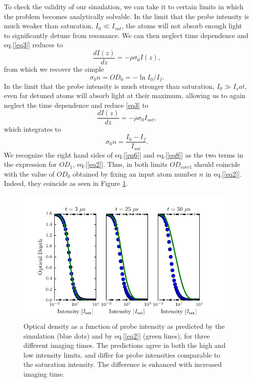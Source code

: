 \documentclass[12pt]{iopart}
\begin{document}
\par To check the validity of our simulation, we can take it to certain limits in which the problem becomes analytically solvable. In the limit that the probe intensity is much weaker than saturation, $I_0\ll I_{sat}$, the atoms will not absorb enough light to significantly detune from resonance. We can then neglect time dependence and eq.[\ref{eq3}] reduces to 
\begin{equation}
\frac{dI(z)}{dz}=-\rho\sigma_0 I(z),
\end{equation}
from which we recover the simple
\begin{equation}
\sigma_0 n = OD_0 = -\ln I_0/I_f. \label{eq6}
\end{equation}
In the limit that the probe intensity is much stronger than saturation, $I_0\gg I_sat$, even far detuned atoms will absorb light at their maximum, allowing us to again neglect the time dependence and reduce \ref{eq3} to 
\begin{equation}
\frac{dI(z)}{dz}=-\rho\sigma_0 I_{sat}, 
\end{equation}
which integrates to 
\begin{equation}
\sigma_0 n = \frac{I_0 - I_f}{I_{sat}}. \label{eq8}
\end{equation}
We recognize the right hand sides of eq.[\ref{eq6}] and eq.[\ref{eq8}] as the two terms in the expression for $OD_1$, eq.[\ref{eq2}]. Thus, in both limits $OD_{corr1}$ should coincide with the value of $OD_0$ obtained by fixing an input atom number $n$ in eq.[\ref{eq2}]. Indeed, they coincide as seen in Figure \ref{fig:IsatLimits}.
\begin{figure}
	\includegraphics{figure3.pdf}
\caption{Optical density as a function of probe intensity as predicted by the simulation (blue dots) and by eq.[\ref{eq2}] (green lines), for three different imaging times. The predictions agree in both the high and low intensity limits, and differ for probe intensities comparable to the saturation intensity. The difference is enhanced with increased imaging time.}  
\label{fig:IsatLimits}
\end{figure}
\end{document}
